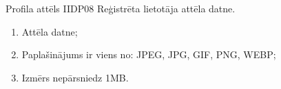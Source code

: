 \parameterTable
{Profila attēls}
{IIDP08}
{
	Reģistrēta lietotāja attēla datne.
}
{
	\begin{enumerate}
		\item Attēla datne;
		\item Paplašinājums ir viens no: JPEG, JPG, GIF, PNG, WEBP;
		\item Izmērs nepārsniedz 1MB.
	\end{enumerate}
}
{
}
